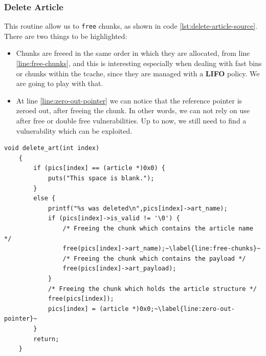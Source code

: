 \documentclass{article}
\numberwithin{equation}{subsection}
\begin{document}
\subsubsection{Delete Article}
This routine allow us to \texttt{free} chunks, as shown in code \ref{lst:delete-article-source}. There are two things to be highlighted:
\begin{itemize}
    \item Chunks are freeed in the same order in which they are allocated, from line \ref{line:free-chunks}, and this is interesting especially when dealing with fast bins or chunks within the tcache, since they are managed with a \textbf{LIFO} policy. We are going to play with that.
    \item At line \ref{line:zero-out-pointer} we can notice that the reference pointer is zeroed out, after freeing the chunk. In other words, we can not rely on use after free or double free vulnerabilities. Up to now, we still need to find a vulnerability which can be exploited.
\end{itemize}
\noindent
\begin{minipage}{\textwidth}
\centering
\lstset{style=cstyle}
\begin{lstlisting}[caption={Delete\_article routine of asciigal source code.},captionpos=b,label={lst:delete-article-source}]
    void delete_art(int index)
	{
		if (pics[index] == (article *)0x0) {
			puts("This space is blank.");
		}
		else {
			printf("%s was deleted\n",pics[index]->art_name);
			if (pics[index]->is_valid != '\0') {
				/* Freeing the chunk which contains the article name */
				free(pics[index]->art_name);~\label{line:free-chunks}~
				/* Freeing the chunk which contains the payload */
				free(pics[index]->art_payload);
			}
			/* Freeing the chunk which holds the article structure */
			free(pics[index]);
			pics[index] = (article *)0x0;~\label{line:zero-out-pointer}~
		}
		return;
	}
\end{lstlisting}
\end{minipage}
\end{document}
